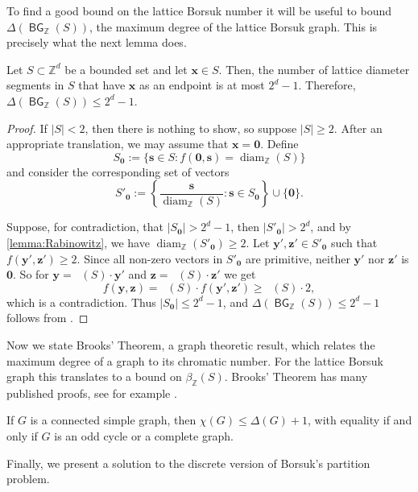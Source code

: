 \documentclass[11pt]{article}
\newcommand{\bs}{\mathbf{s}}
\newcommand{\bx}{\mathbf{x}}
\newcommand{\by}{\mathbf{y}}
\newcommand{\bz}{\mathbf{z}}
\newcommand{\Z}{\mathbb{Z}}
\DeclareMathOperator{\ldiam}{diam_\Z}
\DeclareMathOperator{\BG}{\mathsf{BG}} %
\begin{document}
To find a good bound on the lattice Borsuk number it will be useful to bound $\Delta(\BG_\Z(S))$, the maximum degree of the lattice Borsuk graph. This is precisely what the next lemma does.

\begin{lemma}\label{Lemma:MaxDegree}
    Let $S \subset \Z^d$ be a bounded set and let $\bx \in S$. Then, the number of lattice diameter segments in $S$ that have $\bx$ as an endpoint is at most $2^d - 1$. Therefore, $\Delta(\BG_\Z(S)) \leq 2^d-1$.
\end{lemma}

\begin{proof}
If $|S| <2$, then there is nothing to show, so suppose $|S|\geq 2$.  After an appropriate translation, we may assume that $\bx = \mathbf{0}$. Define
\[
S_{\mathbf{0}} := \{ \bs \in S : f(\mathbf{0}, \bs) = \operatorname{diam}_\Z(S) \}
\]
and consider the corresponding set of vectors
\[
S'_{\mathbf{0}} := \left\{ \frac{\bs}{\operatorname{diam}_\Z(S)} : \bs \in S_{\mathbf{0}} \right\}\cup \{\mathbf{0}\}.
\]

Suppose, for contradiction, that $|S_{\mathbf{0}}| > 2^d-1$, then $|S'_{\mathbf{0}}| > 2^d$, and by \ref{lemma:Rabinowitz}, we have $\operatorname{diam}_\Z(S'_{\mathbf{0}}) \geq 2$. Let $\by', \bz' \in S'_{\mathbf{0}}$ such that $f(\by', \bz') \geq 2$. Since all non-zero vectors in $S'_{\mathbf{0}}$ are primitive, neither $\by'$ nor $\bz'$ is $\mathbf{0}$. So for $\by=\ldiam(S)\cdot\by'$ and $\bz=\ldiam(S)\cdot \bz'$ we get
\[
f(\by, \bz) = \ldiam(S) \cdot f(\by', \bz') \geq \ldiam(S) \cdot 2,
\]
which is a contradiction. Thus $|S_\mathbf{0}| \leq 2^d-1$, and $\Delta(\BG_\Z(S)) \leq 2^d-1$ follows from .
\end{proof}

Now we state Brooks' Theorem, a graph theoretic result, which relates the maximum degree of a graph to its chromatic number. For the lattice Borsuk graph this translates to a bound on $\beta_\Z(S)$. Brooks' Theorem has many published proofs, see for example \cite[Theorem~8.4]{bondy2008graph}.

\begin{theorem}[Brooks, 1941]\label{Thm:Brooks}
    If $G$ is a connected simple graph, then $\chi(G) \leq \Delta(G)+1$, with equality if and only if $G$ is an odd cycle or a complete graph.
\end{theorem}

Finally, we present a solution to the discrete version of Borsuk's partition problem.
\end{document}
